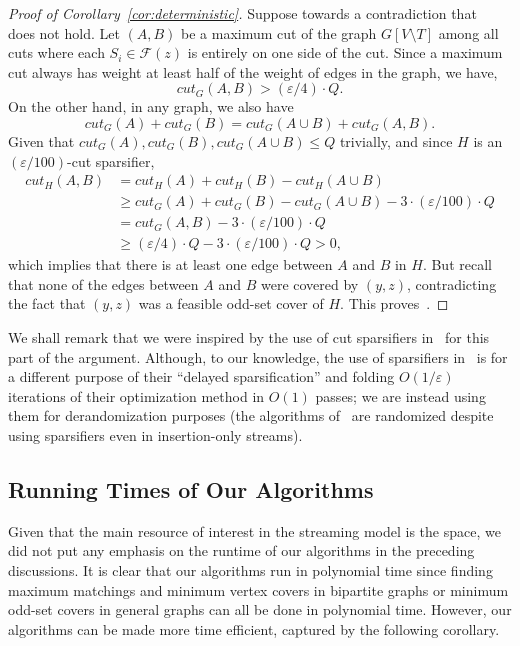 \documentclass{theoretics}
\renewcommand{\leq}{\leqslant}
\renewcommand{\geq}{\geqslant}
\newcommand{\eps}{\varepsilon}
\begin{document}
\begin{proof}[Proof of Corollary~\ref{cor:deterministic}]
Suppose towards a contradiction that~ does not hold. Let $(A,B)$ be a maximum cut of the graph $G[V \setminus T]$ among all cuts where each $S_i \in \mathcal{F}(z)$ is entirely on one side of the cut. 
Since a maximum cut always has weight at least half of the weight of edges in the graph, we have, 
\[
	cut_G(A,B) > (\eps/4) \cdot Q.  
\]
On the other hand, in any graph, we also have
\[
	cut_G(A) + cut_G(B) = cut_G(A \cup B) + cut_G(A, B). 
\]
Given that $cut_G(A),cut_G(B),cut_G(A \cup B) \leq Q$ trivially, and since $H$ is an $(\eps/100)$-cut sparsifier, 
\begin{align*}
	cut_H(A,B) &= cut_H(A) + cut_H(B) - cut_H(A \cup B) \\
	&\geq cut_G(A) + cut_G(B) - cut_G(A \cup B) - 3 \cdot (\eps/100) \cdot Q \\
	&= cut_G(A,B) - 3 \cdot (\eps/100) \cdot Q \\
	&\geq (\eps/4) \cdot Q - 3 \cdot (\eps/100) \cdot Q > 0,
\end{align*}
which implies that there is at least one edge between $A$ and $B$ in $H$. But recall that none of the edges between $A$ and $B$ were covered by $(y,z)$, contradicting the fact that $(y,z)$ was a 
feasible odd-set cover of $H$. This proves~. 
\end{proof}


We shall remark that we were inspired by the use of cut sparsifiers in~\cite{AhnG15} for this part of the argument. Although, to our knowledge, the use of sparsifiers in~\cite{AhnG15} is for a different purpose
of their ``delayed sparsification'' and folding $O(1/\eps)$ iterations of their optimization method in $O(1)$ passes; we are instead using them for derandomization purposes (the algorithms of~\cite{AhnG15} are randomized despite using sparsifiers even
in insertion-only streams). 



\subsection{Running Times of Our Algorithms}\label{sec:ext-runtime}

Given that the main resource of interest in the streaming model is the space, we did not put any emphasis on the runtime of our algorithms in the preceding discussions. 
It is clear that our algorithms run in polynomial time since finding maximum matchings and minimum vertex covers in bipartite graphs or minimum odd-set covers in general graphs can all
be done in polynomial time. However, our algorithms can be made more time efficient, captured by the following corollary. 
\end{document}
